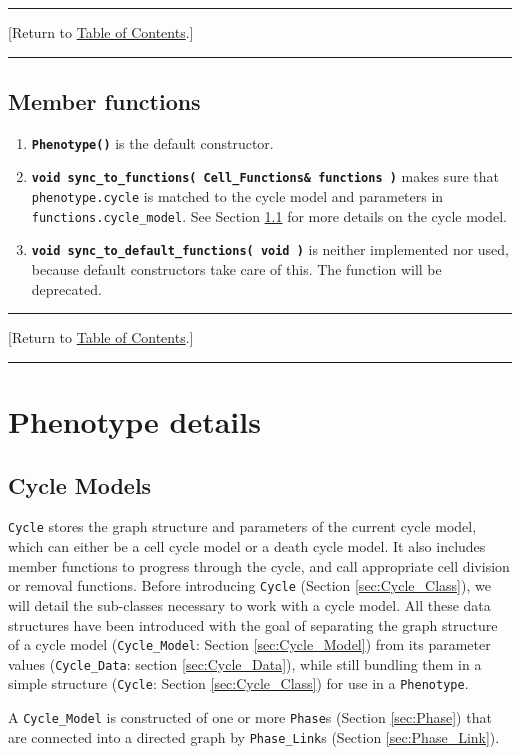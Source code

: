 \documentclass[12pt]{article}
\renewcommand{\v}{\verb}
\newcommand{\smallcode}[1]{\textbf{\texttt{#1}}}
\newcommand{\blue}[1]{\textcolor{blue}{#1}}
\newcommand{\DONE}{}%
\newcommand{\TOClink}{\begin{center}\hrule\vskip-10pt\phantom{.}\hfill[Return to \hyperlink{TOC}{Table of Contents}.]\hfill\phantom{.}\vskip3pt\hrule\end{center}}
\begin{document}
\TOClink 

\subsection{Member functions \DONE}

\begin{enumerate}
\item 
\smallcode{Phenotype()} is the default constructor.  

\item 
\smallcode{void sync\_to\_functions( Cell\_Functions\& functions )} makes sure that 
\v|phenotype.cycle| is matched to the cycle model and parameters in 
\v|functions.cycle_model|. See Section \ref{sec:Cycle} for more details on the 
cycle model. 

\item 
\smallcode{void sync\_to\_default\_functions( void )} is neither implemented nor 
used, because default constructors take care of this. The function will be 
deprecated. 

\end{enumerate}

\TOClink 

\section{Phenotype details}
\label{sec:phenotype_details}


\subsection{Cycle Models\DONE}
\label{sec:Cycle}
\v|Cycle| stores the graph structure and parameters of the current cycle model, which can either be a 
cell cycle model or a death cycle model. It also includes member functions to progress through the 
cycle, and call appropriate cell division or removal functions. Before introducing 
\v|Cycle| (Section \ref{sec:Cycle_Class}), we will detail the sub-classes necessary to work with a cycle model. All these 
data structures have been introduced with the goal of separating the graph structure of a 
cycle model (\v|Cycle_Model|: Section \ref{sec:Cycle_Model}) from its parameter values (\v|Cycle_Data|: section \ref{sec:Cycle_Data}), while still bundling 
them in a simple structure (\v|Cycle|: Section \ref{sec:Cycle_Class}) 
for use in a \v|Phenotype|. 

A \v|Cycle_Model| is constructed of one or more 
\v|Phase|s (Section \ref{sec:Phase}) that are connected into a 
directed graph by \v|Phase_Link|s (Section \ref{sec:Phase_Link}). 
\end{document}
